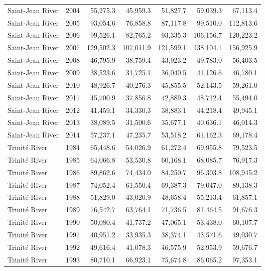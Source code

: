 \begin{longtable}{llrrrrr}
  Saint-Jean River & 2004 & 55,275.3 & 45,959.3 & 51,827.7 & 59,039.3 & 67,113.4 \\ 
  Saint-Jean River & 2005 & 93,054.6 & 76,858.8 & 87,117.8 & 99,510.0 & 112,813.6 \\ 
  Saint-Jean River & 2006 & 99,526.1 & 82,765.2 & 93,335.3 & 106,156.7 & 120,223.2 \\ 
  Saint-Jean River & 2007 & 129,502.3 & 107,011.9 & 121,599.1 & 138,104.1 & 156,925.9 \\ 
  Saint-Jean River & 2008 & 46,795.9 & 38,759.4 & 43,923.2 & 49,783.0 & 56,403.5 \\ 
  Saint-Jean River & 2009 & 38,523.6 & 31,725.1 & 36,040.5 & 41,126.6 & 46,780.1 \\ 
  Saint-Jean River & 2010 & 48,926.7 & 40,276.3 & 45,855.5 & 52,143.5 & 59,261.0 \\ 
  Saint-Jean River & 2011 & 45,700.9 & 37,856.8 & 42,889.3 & 48,712.4 & 55,494.0 \\ 
  Saint-Jean River & 2012 & 41,459.1 & 34,330.3 & 38,883.1 & 44,218.4 & 49,945.1 \\ 
  Saint-Jean River & 2013 & 38,089.5 & 31,500.6 & 35,677.1 & 40,636.1 & 46,014.3 \\ 
  Saint-Jean River & 2014 & 57,237.1 & 47,235.7 & 53,518.2 & 61,162.3 & 69,178.4 \\ 
  Trinité River & 1984 & 65,448.6 & 54,026.9 & 61,272.4 & 69,955.8 & 79,523.5 \\ 
  Trinité River & 1985 & 64,066.8 & 53,530.8 & 60,168.1 & 68,085.7 & 76,917.3 \\ 
  Trinité River & 1986 & 89,862.6 & 74,434.0 & 84,250.7 & 96,303.8 & 108,945.2 \\ 
  Trinité River & 1987 & 74,052.4 & 61,550.4 & 69,387.3 & 79,047.0 & 89,138.3 \\ 
  Trinité River & 1988 & 51,829.0 & 43,020.9 & 48,658.4 & 55,213.4 & 61,857.1 \\ 
  Trinité River & 1989 & 76,542.7 & 63,764.1 & 71,736.5 & 81,464.5 & 91,676.3 \\ 
  Trinité River & 1990 & 50,080.4 & 41,737.2 & 47,065.1 & 53,438.0 & 60,107.7 \\ 
  Trinité River & 1991 & 40,951.2 & 33,935.3 & 38,374.1 & 43,571.6 & 49,030.7 \\ 
  Trinité River & 1992 & 49,616.4 & 41,078.3 & 46,575.9 & 52,953.9 & 59,676.7 \\ 
  Trinité River & 1993 & 80,710.1 & 66,923.1 & 75,674.8 & 86,065.2 & 97,353.1 \\ 

\end{longtable}
